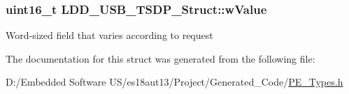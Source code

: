 \subsubsection[{w\+Value}]{\setlength{\rightskip}{0pt plus 5cm}uint16\+\_\+t L\+D\+D\+\_\+\+U\+S\+B\+\_\+\+T\+S\+D\+P\+\_\+\+Struct\+::w\+Value}\label{struct_l_d_d___u_s_b___t_s_d_p___struct_abe97822a1a8976f53da5a43b8db8cfd3}
Word-\/sized field that varies according to request 

The documentation for this struct was generated from the following file\+:\begin{DoxyCompactItemize}
\item 
D\+:/\+Embedded Software U\+S/es18aut13/\+Project/\+Generated\+\_\+\+Code/\hyperlink{_p_e___types_8h}{P\+E\+\_\+\+Types.\+h}\end{DoxyCompactItemize}
